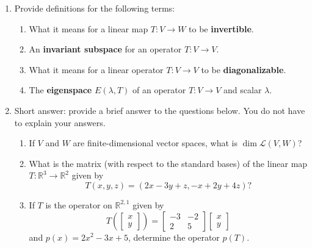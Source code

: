 \documentclass[12pt]{article}
\newcommand{\points}[1]{\marginpar{\hspace{24pt}[#1]}}
\newcommand{\R}{\mathbb{R}}
\begin{document}
\begin{enumerate}
\item Provide definitions for the following terms:
\begin{enumerate}
 \item What it means for a linear map $T:V\to W$ to be {\bf invertible}. \points{2}

\vspace{2in}
 
 \item An {\bf invariant subspace} for an operator $T:V\to V$. \points{2}

\vspace{2in}

 \item What it means for a linear operator $T:V\to V$ to be {\bf diagonalizable}.\points{2}

\vspace{2in}

 \item The {\bf eigenspace} $E(\lambda, T)$ of an operator $T:V\to V$ and scalar $\lambda$.\points{2}
\end{enumerate}
\newpage

\item Short answer: provide a brief answer to the questions below. You do not have to explain your answers.
\begin{enumerate}
 \item If $V$ and $W$ are finite-dimensional vector spaces, what is $\dim\mathcal{L}(V,W)$?\points{1}

\vspace{1in}

 \item What is the matrix (with respect to the standard bases) of the linear map $T:\R^3\to\R^2$ given by \points{3}
\[
 T(x,y,z) = (2x-3y+z,-x+2y+4z)?
\]

\vspace{2in}

\item If $T$ is the operator on $\R^{2,1}$ given by
\[
 T\left(\begin{bmatrix}x\\y\end{bmatrix}\right) = \begin{bmatrix}-3&-2\\2&5\end{bmatrix}\begin{bmatrix}x\\y\end{bmatrix}
\]
 and $p(x) = 2x^2-3x+5$, determine the operator $p(T)$. \points{4}


\end{enumerate}
\end{enumerate}
\end{document}
